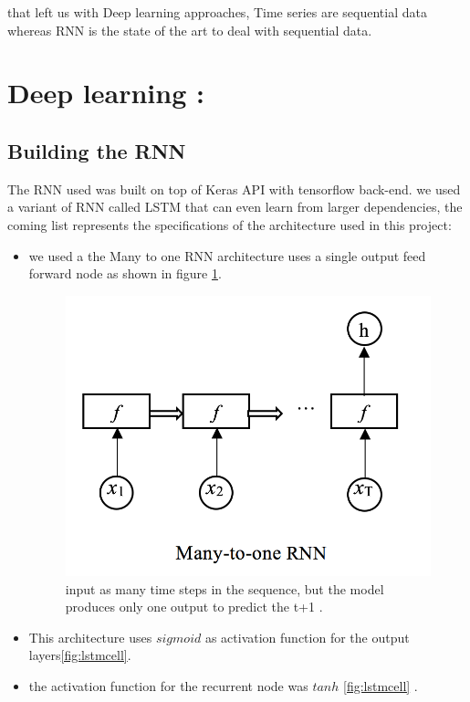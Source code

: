 that left us with Deep learning approaches, Time series are sequential data whereas RNN is the state of the art to deal with sequential data.
\section{Deep learning :}
\subsection{Building the RNN}
The RNN used was built on top of Keras API\cite{keras2015} with tensorflow  back-end. we used a variant of RNN called LSTM  that can even learn from larger dependencies, the coming list represents the specifications of the architecture used in this project:
\begin{itemize}
\item we used a the Many to one RNN architecture  uses a single output feed forward node as shown in figure \ref{fig:manyto_one}.

\begin{figure}[H]
\centering
\includegraphics[scale=.3]{img/many_to_one.png} 
\caption{input as many time steps in the sequence, but the model produces only one output to predict the t+1 .}
\label{fig:manyto_one}
\end{figure}

    \item This architecture uses  $sigmoid$  as activation function for the output layers\ref{fig:lstmcell}.
    \item the activation function for the recurrent node was $tanh$ \ref{fig:lstmcell} .
\end{itemize}

